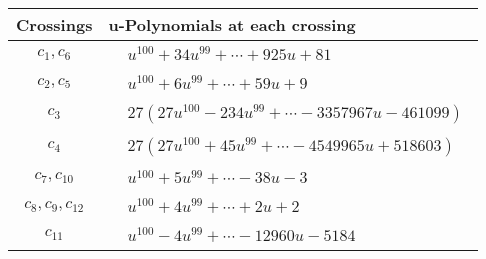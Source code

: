 \documentclass[1p]{elsarticle_modified}
\theoremstyle{definition}
\begin{document}
\begin{tabular}{m{50pt}|m{274pt}}
Crossings & \hspace{64pt}u-Polynomials at each crossing \\
\hline $$\begin{aligned}c_{1},c_{6}\end{aligned}$$&$\begin{aligned}
&u^{100}+34 u^{99}+\cdots+925 u+81
\end{aligned}$\\
\hline $$\begin{aligned}c_{2},c_{5}\end{aligned}$$&$\begin{aligned}
&u^{100}+6 u^{99}+\cdots+59 u+9
\end{aligned}$\\
\hline $$\begin{aligned}c_{3}\end{aligned}$$&$\begin{aligned}
&27(27 u^{100}-234 u^{99}+\cdots-3357967 u-461099)
\end{aligned}$\\
\hline $$\begin{aligned}c_{4}\end{aligned}$$&$\begin{aligned}
&27(27 u^{100}+45 u^{99}+\cdots-4549965 u+518603)
\end{aligned}$\\
\hline $$\begin{aligned}c_{7},c_{10}\end{aligned}$$&$\begin{aligned}
&u^{100}+5 u^{99}+\cdots-38 u-3
\end{aligned}$\\
\hline $$\begin{aligned}c_{8},c_{9},c_{12}\end{aligned}$$&$\begin{aligned}
&u^{100}+4 u^{99}+\cdots+2 u+2
\end{aligned}$\\
\hline $$\begin{aligned}c_{11}\end{aligned}$$&$\begin{aligned}
&u^{100}-4 u^{99}+\cdots-12960 u-5184
\end{aligned}$\\
\hline
\end{tabular}\\~\\
\end{document}
